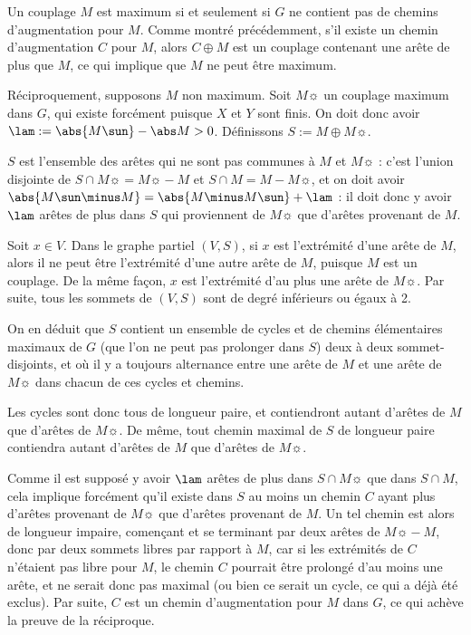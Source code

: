  \SEP{}
    Un couplage $M$ est maximum si et seulement si $G$ ne contient pas de chemins d'augmentation pour $M$.
 \SEP\jpreuve
    Comme montré précédemment, s'il existe un chemin d'augmentation $C$ pour $M$, alors $C \oplus M$ est un couplage contenant une arête de plus que $M$, ce qui implique que $M$ ne peut être maximum.
    
    Réciproquement, supposons $M$ non maximum. Soit $M\sun$ un couplage maximum dans $G$, qui existe forcément puisque $X$ et $Y$ sont finis. On doit donc avoir $\lam := \abs {M\sun} - \abs M > 0$. Définissons $S := M \oplus M\sun$.
    
    $S$ est l'ensemble des arêtes qui ne sont pas communes à $M$ et $M\sun$ : c'est l'union disjointe de $S \cap M\sun = M\sun \minus M$ et $S \cap M = M \minus M\sun$, et on doit avoir $\abs{M\sun \minus M} = \abs{M \minus M\sun}+\lam$ : il doit donc y avoir $\lam$ arêtes de plus dans $S$ qui proviennent de $M\sun$ que d'arêtes provenant de $M$.
    
    Soit $x \in V$. Dans le graphe partiel $(V, S)$, si $x$ est l'extrémité d'une arête de $M$, alors il ne peut être l'extrémité d'une autre arête de $M$, puisque $M$ est un couplage. De la même façon, $x$ est l'extrémité d'au plus une arête de $M\sun$. Par suite, tous les sommets de $(V,S)$ sont de degré inférieurs ou égaux à 2.
    
    On en déduit que $S$ contient un ensemble de cycles et de chemins élémentaires maximaux de $G$ (que l'on ne peut pas prolonger dans $S$) deux à deux sommet-disjoints, et où il y a toujours alternance entre une arête de $M$ et une arête de $M\sun$ dans chacun de ces cycles et chemins.
    
    Les cycles sont donc tous de longueur paire, et contiendront autant d'arêtes de $M$ que d'arêtes de $M\sun$. De même, tout chemin maximal de $S$ de longueur paire contiendra autant d'arêtes de $M$ que d'arêtes de $M\sun$.
    
    Comme il est supposé y avoir $\lam$ arêtes de plus dans $S \cap M\sun$ que dans $S \cap M$, cela implique forcément qu'il existe dans $S$ au moins un chemin $C$ ayant plus d'arêtes provenant de $M\sun$ que d'arêtes provenant de $M$. Un tel chemin est alors de longueur impaire, començant et se terminant par deux arêtes de $M\sun \minus M$, donc par deux sommets libres par rapport à $M$, car si les extrémités de $C$ n'étaient pas libre pour $M$, le chemin $C$ pourrait être prolongé d'au moins une arête, et ne serait donc pas maximal (ou bien ce serait un cycle, ce qui a déjà été exclus). Par suite, $C$ est un chemin d'augmentation pour $M$ dans $G$, ce qui achève la preuve de la réciproque.
    
